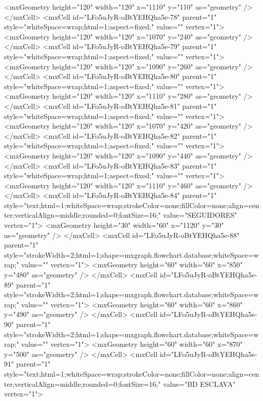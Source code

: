           <mxGeometry height="120" width="120" x="1110" y="110" as="geometry" />
        </mxCell>
        <mxCell id="LFo5uJyR-oBtYEHQha5e-78" parent="1" style="whiteSpace=wrap;html=1;aspect=fixed;" value="" vertex="1">
          <mxGeometry height="120" width="120" x="1070" y="240" as="geometry" />
        </mxCell>
        <mxCell id="LFo5uJyR-oBtYEHQha5e-79" parent="1" style="whiteSpace=wrap;html=1;aspect=fixed;" value="" vertex="1">
          <mxGeometry height="120" width="120" x="1090" y="260" as="geometry" />
        </mxCell>
        <mxCell id="LFo5uJyR-oBtYEHQha5e-80" parent="1" style="whiteSpace=wrap;html=1;aspect=fixed;" value="" vertex="1">
          <mxGeometry height="120" width="120" x="1110" y="280" as="geometry" />
        </mxCell>
        <mxCell id="LFo5uJyR-oBtYEHQha5e-81" parent="1" style="whiteSpace=wrap;html=1;aspect=fixed;" value="" vertex="1">
          <mxGeometry height="120" width="120" x="1070" y="420" as="geometry" />
        </mxCell>
        <mxCell id="LFo5uJyR-oBtYEHQha5e-82" parent="1" style="whiteSpace=wrap;html=1;aspect=fixed;" value="" vertex="1">
          <mxGeometry height="120" width="120" x="1090" y="440" as="geometry" />
        </mxCell>
        <mxCell id="LFo5uJyR-oBtYEHQha5e-83" parent="1" style="whiteSpace=wrap;html=1;aspect=fixed;" value="" vertex="1">
          <mxGeometry height="120" width="120" x="1110" y="460" as="geometry" />
        </mxCell>
        <mxCell id="LFo5uJyR-oBtYEHQha5e-84" parent="1" style="text;html=1;whiteSpace=wrap;strokeColor=none;fillColor=none;align=center;verticalAlign=middle;rounded=0;fontSize=16;" value="SEGUIDORES" vertex="1">
          <mxGeometry height="30" width="60" x="1120" y="30" as="geometry" />
        </mxCell>
        <mxCell id="LFo5uJyR-oBtYEHQha5e-88" parent="1" style="strokeWidth=2;html=1;shape=mxgraph.flowchart.database;whiteSpace=wrap;" value="" vertex="1">
          <mxGeometry height="60" width="60" x="850" y="480" as="geometry" />
        </mxCell>
        <mxCell id="LFo5uJyR-oBtYEHQha5e-89" parent="1" style="strokeWidth=2;html=1;shape=mxgraph.flowchart.database;whiteSpace=wrap;" value="" vertex="1">
          <mxGeometry height="60" width="60" x="860" y="490" as="geometry" />
        </mxCell>
        <mxCell id="LFo5uJyR-oBtYEHQha5e-90" parent="1" style="strokeWidth=2;html=1;shape=mxgraph.flowchart.database;whiteSpace=wrap;" value="" vertex="1">
          <mxGeometry height="60" width="60" x="870" y="500" as="geometry" />
        </mxCell>
        <mxCell id="LFo5uJyR-oBtYEHQha5e-91" parent="1" style="text;html=1;whiteSpace=wrap;strokeColor=none;fillColor=none;align=center;verticalAlign=middle;rounded=0;fontSize=16;" value="BD ESCLAVA" vertex="1">
